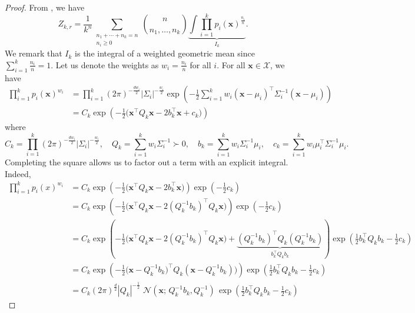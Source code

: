 \documentclass[accepted]{uai2026} %
\newcommand{\vx}{\mathbf{x}}
\begin{document}
\begin{proof}
From , we have
\begin{equation}\label{eq: from lemma d}
Z_{k,r} = \frac{1}{k^n}\sum_{\substack{n_1+\cdots+n_k=n \\ n_i \ge 0}} 
\binom{n}{n_1,\dots,n_k}
\underbrace{\int \prod_{i=1}^k p_i(\vx)^{\frac{n_i}{n}}}_{I_k}.
\end{equation}
We remark that $I_k$ is the integral of a weighted geometric mean since $\sum_{i=1}^k \frac{n_i}{n} = 1$. Let us denote the weights as $w_i = \frac{n_i}{n}$ for all $i$. For all 
$\vx \in \mathcal{X}$, we have
\begin{align}
\prod_{i=1}^k p_i(\vx)^{w_i} & = \prod_{i=1}^k (2\pi)^{-\frac{dw_i}{2}}| \Sigma_i |^{-\frac{w_i}{2}} \exp \left(-\frac{1}{2} \sum_{i=1}^k w_i (\vx - \mu_i)^\top \Sigma_i^{-1} (\vx - \mu_i)\right) \label{eq: weighted geometric mean first expression} \\
& = C_k\exp \left( -\frac{1}{2} \big( \vx^\top Q_k \vx - 2 b_k^\top \vx + c_k \big)\right)
\end{align}
where
\begin{equation}\label{eq: intermediate quantities}
C_k = \prod_{i=1}^k (2\pi)^{-\frac{dw_i}{2}}| \Sigma_i |^{-\frac{w_i}{2}}, \quad Q_k = \sum_{i=1}^k w_i \Sigma_i^{-1} \succ 0, \quad b_k = \sum_{i=1}^k w_i \Sigma_i^{-1} \mu_i, \quad c_k = \sum_{i=1}^k w_i \mu_i^\top \Sigma_i^{-1} \mu_i.
\end{equation}
Completing the square allows us to factor out a term with an explicit integral. Indeed,
\begin{align}
\prod_{i=1}^k p_i(x)^{w_i} & =  C_k \exp \left( -\frac{1}{2} \big( \vx^\top Q_k \vx - 2 b_k^\top \vx \big) \right) \exp\left( -\frac{1}{2} c_k \right)\\
& =  C_k \exp \left( -\frac{1}{2} \big( \vx^\top Q_k \vx - 2 (Q_k^{-1} b_k )^\top Q_k \vx \big) \right) \exp\left( -\frac{1}{2} c_k \right) \label{eq: Q symmetric} \\
& =  C_k \exp \left( -\frac{1}{2} \big( \vx^\top Q_k \vx - 2 (Q_k^{-1} b_k )^\top Q_k \vx \big) + \underbrace{(Q_k^{-1} b_k)^\top Q_k (Q_k^{-1} b_k)}_{b_k^\top Q_k b_k} \right) \exp\left( \frac{1}{2} b_k^\top Q_k b_k -\frac{1}{2} c_k \right)\\& = C_k \exp \left( -\frac{1}{2} \big( \vx - Q_k^{-1}b_k)^\top Q_k (\vx - Q_k^{-1}b_k)\big)\right) \exp\left( \frac{1}{2} b_k^\top Q_k b_k -\frac{1}{2} c_k \right)\\
& = C_k (2 \pi)^{\frac{d}{2}} | Q_k |^{-\frac{1}{2}} \,\, \mathcal{N}(\vx; \, Q_k^{-1}b_k, Q_k^{-1}) \, \exp\left( \frac{1}{2} b_k^\top Q_k b_k -\frac{1}{2} c_k \right)

\end{align}
\end{proof}
\end{document}
